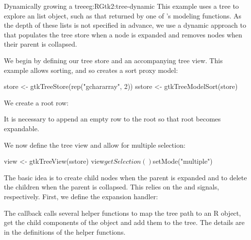 \begin{example}{Dynamically growing a tree}{eg:RGtk2:tree-dynamic}
This example uses a tree to explore an \R\/ list object, such as that
returned by one of \R's modeling functions.  As the depth of these
lists is not specified in advance, we use a dynamic approach to
that populates the tree store when a node is expanded and removes
nodes when their parent is collapsed.


We begin by defining our tree store and an accompanying tree
view. This example allows sorting, and so creates a sort proxy model:
\begin{Schunk}
\begin{Sinput}
 store <- gtkTreeStore(rep("gchararray", 2))
 sstore <- gtkTreeModelSort(store)
\end{Sinput}
\end{Schunk}

We create a root row:
\begin{Schunk}
\end{Schunk}
%
It is necessary to append an empty row to the root so that root
becomes expandable.

We now define the tree view and allow for multiple selection:
\begin{Schunk}
\begin{Sinput}
 view <- gtkTreeView(sstore)
 view$getSelection()$setMode("multiple")
\end{Sinput}
\end{Schunk}

The basic idea is to create child nodes when the parent is expanded
and to delete the children when the parent is collapsed. This relies
on the  and  signals,
respectively. First, we define the expansion handler:
\begin{Schunk}
\end{Schunk}
%
The callback calls several helper functions to map the tree path to an
R object, get the child components of the object and add them to the
tree. The details are in the definitions of the helper functions.


\end{example}
